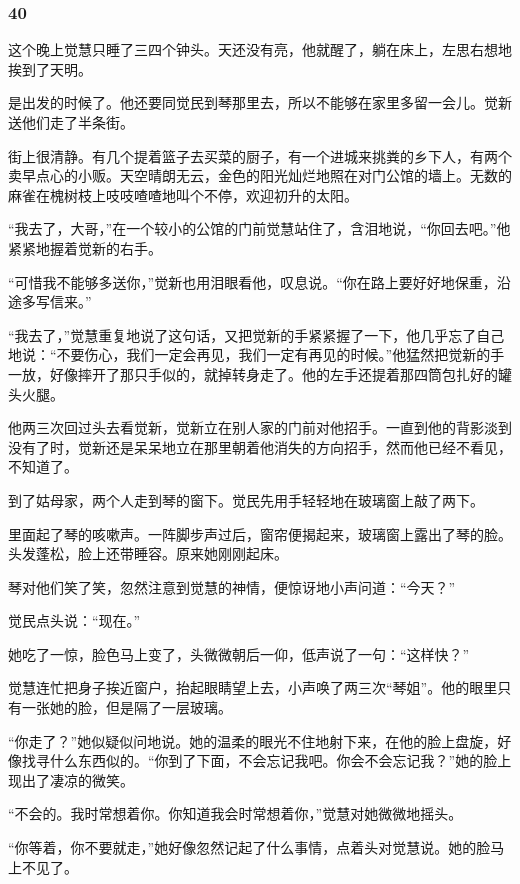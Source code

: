\subsubsection*{40}



\par 这个晚上觉慧只睡了三四个钟头。天还没有亮，他就醒了，躺在床上，左思右想地挨到了天明。
\par 是出发的时候了。他还要同觉民到琴那里去，所以不能够在家里多留一会儿。觉新送他们走了半条街。
\par 街上很清静。有几个提着篮子去买菜的厨子，有一个进城来挑粪的乡下人，有两个卖早点心的小贩。天空晴朗无云，金色的阳光灿烂地照在对门公馆的墙上。无数的麻雀在槐树枝上吱吱喳喳地叫个不停，欢迎初升的太阳。
\par “我去了，大哥，”在一个较小的公馆的门前觉慧站住了，含泪地说，“你回去吧。”他紧紧地握着觉新的右手。
\par “可惜我不能够多送你，”觉新也用泪眼看他，叹息说。“你在路上要好好地保重，沿途多写信来。”
\par “我去了，”觉慧重复地说了这句话，又把觉新的手紧紧握了一下，他几乎忘了自己地说：“不要伤心，我们一定会再见，我们一定有再见的时候。”他猛然把觉新的手一放，好像摔开了那只手似的，就掉转身走了。他的左手还提着那四筒包扎好的罐头火腿。
\par 他两三次回过头去看觉新，觉新立在别人家的门前对他招手。一直到他的背影淡到没有了时，觉新还是呆呆地立在那里朝着他消失的方向招手，然而他已经不看见，不知道了。
\par 到了姑母家，两个人走到琴的窗下。觉民先用手轻轻地在玻璃窗上敲了两下。
\par 里面起了琴的咳嗽声。一阵脚步声过后，窗帘便揭起来，玻璃窗上露出了琴的脸。头发蓬松，脸上还带睡容。原来她刚刚起床。
\par 琴对他们笑了笑，忽然注意到觉慧的神情，便惊讶地小声问道：“今天？”
\par 觉民点头说：“现在。”
\par 她吃了一惊，脸色马上变了，头微微朝后一仰，低声说了一句：“这样快？”
\par 觉慧连忙把身子挨近窗户，抬起眼睛望上去，小声唤了两三次“琴姐”。他的眼里只有一张她的脸，但是隔了一层玻璃。
\par “你走了？”她似疑似问地说。她的温柔的眼光不住地射下来，在他的脸上盘旋，好像找寻什么东西似的。“你到了下面，不会忘记我吧。你会不会忘记我？”她的脸上现出了凄凉的微笑。
\par “不会的。我时常想着你。你知道我会时常想着你，”觉慧对她微微地摇头。
\par “你等着，你不要就走，”她好像忽然记起了什么事情，点着头对觉慧说。她的脸马上不见了。
